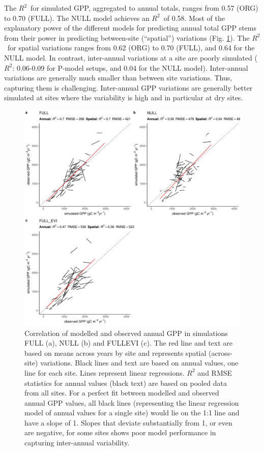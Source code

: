 \documentclass{myreport}
\newcommand{\rsq}{$R^2$}
\begin{document}
The \rsq\ for simulated GPP, aggregated to annual totals, ranges from 0.57 (ORG) to 0.70 (FULL). The NULL model achieves an \rsq\ of 0.58. Most of the explanatory power of the different models for predicting annual total GPP stems from their power in predicting between-site (``spatial'') variations (Fig. \ref{fig:modobs_spatialannual}). The \rsq\ for spatial variations ranges from 0.62 (ORG) to 0.70 (FULL), and 0.64 for the NULL model. In contrast, inter-annual  variations at a site are poorly simulated (\rsq : 0.06-0.09 for P-model setups, and 0.04 for the NULL model). Inter-annual variations are generally much smaller than between site variations. Thus, capturing them is challenging. Inter-annual GPP variations are generally better simulated at sites where the variability is high and in particular at dry sites. 

\begin{figure}[!ht]
    \includegraphics[width=\textwidth]{fig/modobs_spatial_annual.pdf}
    \caption{Correlation of modelled and observed annual GPP in simulations FULL (a), NULL (b) and FULL\textunderscore EVI (c). The red line and text are based on means across years by site and represents spatial (across-site) variations. Black lines and text are based on annual values, one line for each site. Lines represent linear regressions. $R^2$ and RMSE statistics for annual values (black text) are based on pooled data from all sites. For a perfect fit between modelled and observed annual GPP values, all black lines (representing the linear regression model of annual values for a single site) would lie on the 1:1 line and have a slope of 1. Slopes that deviate substantially from 1, or even are negative, for some sites shows poor model performance in capturing inter-annual variability.}
    \label{fig:modobs_spatialannual}
\end{figure}
\end{document}
